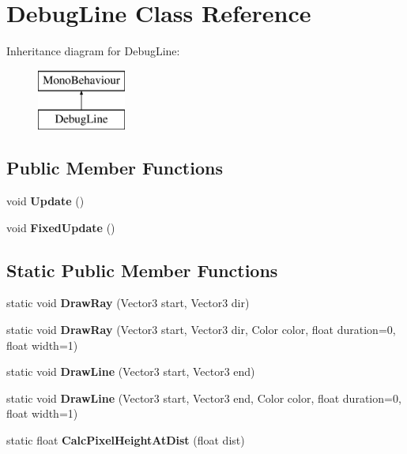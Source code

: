 \hypertarget{class_debug_line}{}\section{Debug\+Line Class Reference}
\label{class_debug_line}
Inheritance diagram for Debug\+Line\+:\begin{figure}[H]
\begin{center}
\leavevmode
\includegraphics[height=2.000000cm]{class_debug_line}
\end{center}
\end{figure}
\subsection*{Public Member Functions}
\begin{DoxyCompactItemize}
\item 
\mbox{\label{class_debug_line_abe4fa3efa236e9da37c69612e22fc41e}} 
void {\bfseries Update} ()
\item 
\mbox{\label{class_debug_line_ad3f88ca561b551a227d194afad58fb82}} 
void {\bfseries Fixed\+Update} ()
\end{DoxyCompactItemize}
\subsection*{Static Public Member Functions}
\begin{DoxyCompactItemize}
\item 
\mbox{\label{class_debug_line_ad5dce7848806f48ae750884ab90b2f94}} 
static void {\bfseries Draw\+Ray} (Vector3 start, Vector3 dir)
\item 
\mbox{\label{class_debug_line_a6a60120da5191eb4fdbdedb302cfb9fc}} 
static void {\bfseries Draw\+Ray} (Vector3 start, Vector3 dir, Color color, float duration=0, float width=1)
\item 
\mbox{\label{class_debug_line_ae6b924e0cf572d87f77b34b66ff33515}} 
static void {\bfseries Draw\+Line} (Vector3 start, Vector3 end)
\item 
\mbox{\label{class_debug_line_af9219f4d9be0b63965dcb81d96fa6fad}} 
static void {\bfseries Draw\+Line} (Vector3 start, Vector3 end, Color color, float duration=0, float width=1)
\item 
\mbox{\label{class_debug_line_a51fdc719debca09b01cbdbd6ee34fb5d}} 
static float {\bfseries Calc\+Pixel\+Height\+At\+Dist} (float dist)
\end{DoxyCompactItemize}
